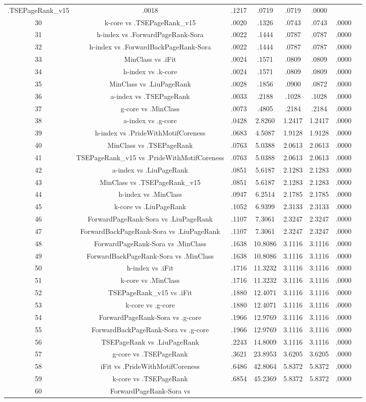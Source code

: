 \documentclass[a4paper,10pt]{article}
\begin{document}
\begin{landscape}
\begin{table}[!htp]
\begin{tabular}{cccccccc}
.TSEPageRank_v15&.0018&.1217&.0719&.0719&.0000\\30&k-core vs .TSEPageRank_v15&.0020&.1326&.0743&.0743&.0000\\31&h-index vs .ForwardPageRank-Sora&.0022&.1444&.0787&.0787&.0000\\32&h-index vs .ForwardBackPageRank-Sora&.0022&.1444&.0787&.0787&.0000\\33&MinClass vs .iFit&.0024&.1571&.0809&.0809&.0000\\34&h-index vs .k-core&.0024&.1571&.0809&.0809&.0000\\35&MinClass vs .LiuPageRank&.0028&.1856&.0900&.0872&.0000\\36&a-index vs .TSEPageRank&.0033&.2188&.1028&.1028&.0000\\37&g-core vs .MinClass&.0073&.4805&.2184&.2184&.0000\\38&a-index vs .g-core&.0428&2.8260&1.2417&1.2417&.0000\\39&h-index vs .PrideWithMotifCoreness&.0683&4.5087&1.9128&1.9128&.0000\\40&MinClass vs .TSEPageRank&.0763&5.0388&2.0613&2.0613&.0000\\41&TSEPageRank_v15 vs .PrideWithMotifCoreness&.0763&5.0388&2.0613&2.0613&.0000\\42&a-index vs .LiuPageRank&.0851&5.6187&2.1283&2.1283&.0000\\43&MinClass vs .TSEPageRank_v15&.0851&5.6187&2.1283&2.1283&.0000\\44&h-index vs .MinClass&.0947&6.2514&2.1785&2.1785&.0000\\45&k-core vs .LiuPageRank&.1052&6.9399&2.3133&2.3133&.0000\\46&ForwardPageRank-Sora vs .LiuPageRank&.1107&7.3061&2.3247&2.3247&.0000\\47&ForwardBackPageRank-Sora vs .LiuPageRank&.1107&7.3061&2.3247&2.3247&.0000\\48&ForwardPageRank-Sora vs .MinClass&.1638&10.8086&3.1116&3.1116&.0000\\49&ForwardBackPageRank-Sora vs .MinClass&.1638&10.8086&3.1116&3.1116&.0000\\50&h-index vs .iFit&.1716&11.3232&3.1116&3.1116&.0000\\51&k-core vs .MinClass&.1716&11.3232&3.1116&3.1116&.0000\\52&TSEPageRank_v15 vs .iFit&.1880&12.4071&3.1116&3.1116&.0000\\53&k-core vs .g-core&.1880&12.4071&3.1116&3.1116&.0000\\54&ForwardPageRank-Sora vs .g-core&.1966&12.9769&3.1116&3.1116&.0000\\55&ForwardBackPageRank-Sora vs .g-core&.1966&12.9769&3.1116&3.1116&.0000\\56&TSEPageRank vs .LiuPageRank&.2243&14.8009&3.1116&3.1116&.0000\\57&g-core vs .TSEPageRank&.3621&23.8953&3.6205&3.6205&.0000\\58&iFit vs .PrideWithMotifCoreness&.6486&42.8064&5.8372&5.8372&.0000\\59&k-core vs .TSEPageRank&.6854&45.2369&5.8372&5.8372&.0000\\60&ForwardPageRank-Sora vs 
\end{tabular}
\end{table}
\end{landscape}
\end{document}

